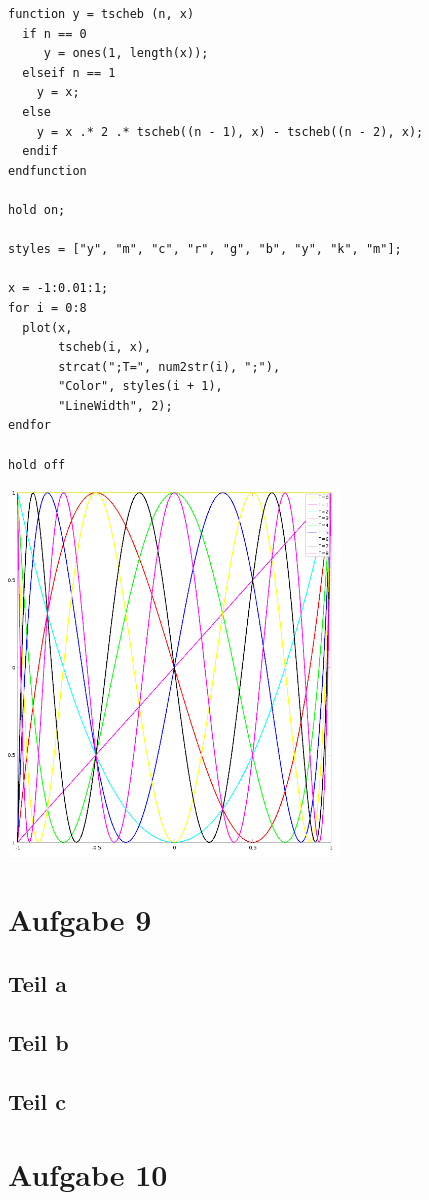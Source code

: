 \documentclass[10pt,a4paper]{article}
\begin{document}
\begin{lstlisting}
function y = tscheb (n, x)
  if n == 0
     y = ones(1, length(x));
  elseif n == 1
    y = x;
  else
    y = x .* 2 .* tscheb((n - 1), x) - tscheb((n - 2), x);
  endif
endfunction

hold on;

styles = ["y", "m", "c", "r", "g", "b", "y", "k", "m"];

x = -1:0.01:1;
for i = 0:8
  plot(x,
       tscheb(i, x),
       strcat(";T=", num2str(i), ";"),
       "Color", styles(i + 1),
       "LineWidth", 2);
endfor

hold off
\end{lstlisting}

\includegraphics[width=250pt]{3_8.png}

\section{Aufgabe 9}

\subsection{Teil a}

\subsection{Teil b}

\subsection{Teil c}

\section{Aufgabe 10}
\end{document}
